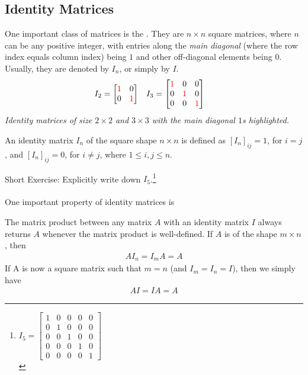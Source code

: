 \subsection{Identity Matrices}
One important class of matrices is the . They are $n \times n$ square matrices, where $n$ can be any positive integer, with entries along the \textit{main diagonal} (where the row index equals column index) being $1$ and other off-diagonal elements being $0$. Usually, they are denoted by $I_n$, or simply by $I$.
\begin{align*}
I_2 &= 
\begin{bmatrix}
\mathcolor{red}{1} & 0 \\
0 & \mathcolor{red}{1}
\end{bmatrix}
& I_3 &= 
\begin{bmatrix}
\mathcolor{red}{1} & 0 & 0 \\
0 & \mathcolor{red}{1} & 0 \\
0 & 0 & \mathcolor{red}{1}
\end{bmatrix}
\end{align*}
\textit{Identity matrices of size $2 \times 2$ and $3 \times 3$ with the main diagonal $1$s highlighted.}
\begin{defn}
\label{defn:identity}
An identity matrix $I_n$ of the square shape $n \times n$ is defined as $[I_{n}]_{ij} = 1$, for $i = j$, and $[I_{n}]_{ij} = 0$, for $i \neq j$, where $1 \leq i,j \leq n$.
\end{defn}
Short Exercise: Explicitly write down $I_5$.\footnote{$I_5=
\begin{bmatrix}
1 & 0 & 0 & 0 & 0 \\
0 & 1 & 0 & 0 & 0 \\
0 & 0 & 1 & 0 & 0 \\
0 & 0 & 0 & 1 & 0 \\
0 & 0 & 0 & 0 & 1
\end{bmatrix}$\\}\\
\\
One important property of identity matrices is
\begin{proper}
\label{proper:identity}
The matrix product between any matrix $A$ with an identity matrix $I$ always returns $A$ whenever the matrix product is well-defined. If $A$ is of the shape $m \times n$, then 
\begin{align}
AI_n = I_mA = A    
\end{align}
If A is now a square matrix such that $m=n$ (and $I_m = I_n = I$), then we simply have 
\begin{align}
AI = IA = A    
\end{align}
\end{proper}
